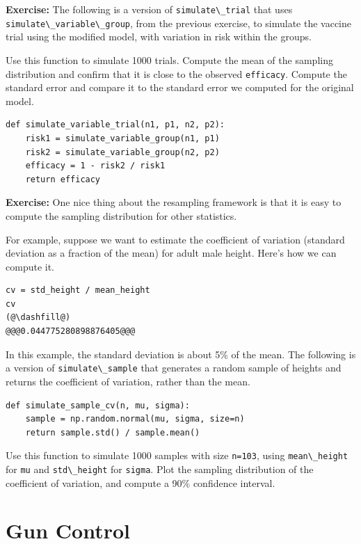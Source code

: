 \textbf{Exercise:} The following is a version of
\passthrough{\lstinline!simulate\_trial!} that uses
\passthrough{\lstinline!simulate\_variable\_group!}, from the previous
exercise, to simulate the vaccine trial using the modified model, with
variation in risk within the groups.

Use this function to simulate 1000 trials. Compute the mean of the
sampling distribution and confirm that it is close to the observed
\passthrough{\lstinline!efficacy!}. Compute the standard error and
compare it to the standard error we computed for the original model.

\begin{lstlisting}[]
def simulate_variable_trial(n1, p1, n2, p2):
    risk1 = simulate_variable_group(n1, p1)
    risk2 = simulate_variable_group(n2, p2)
    efficacy = 1 - risk2 / risk1
    return efficacy
\end{lstlisting}

\textbf{Exercise:} One nice thing about the resampling framework is that
it is easy to compute the sampling distribution for other statistics.

For example, suppose we want to estimate the coefficient of variation
(standard deviation as a fraction of the mean) for adult male height.
Here's how we can compute it.

\begin{lstlisting}[]
cv = std_height / mean_height
cv
(@\dashfill@)
@@@0.044775280898876405@@@
\end{lstlisting}

In this example, the standard deviation is about 5\% of the mean. The
following is a version of \passthrough{\lstinline!simulate\_sample!}
that generates a random sample of heights and returns the coefficient of
variation, rather than the mean.

\begin{lstlisting}[]
def simulate_sample_cv(n, mu, sigma):
    sample = np.random.normal(mu, sigma, size=n)
    return sample.std() / sample.mean()
\end{lstlisting}

Use this function to simulate 1000 samples with size
\passthrough{\lstinline!n=103!}, using
\passthrough{\lstinline!mean\_height!} for \passthrough{\lstinline!mu!}
and \passthrough{\lstinline!std\_height!} for
\passthrough{\lstinline!sigma!}. Plot the sampling distribution of the
coefficient of variation, and compute a 90\% confidence interval.

\hypertarget{gun-control}{%
\section{Gun Control}\label{gun-control}}

